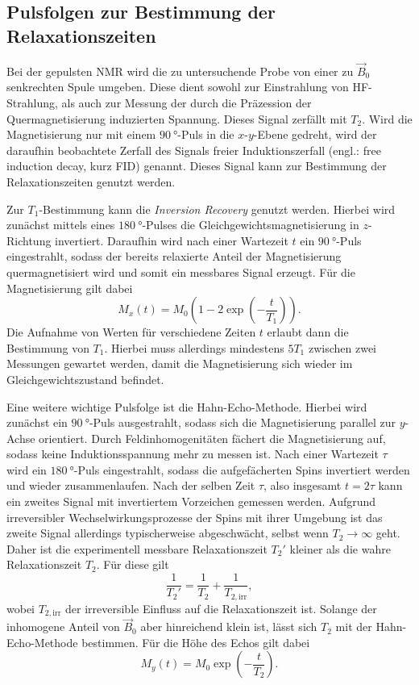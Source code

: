 \subsection{Pulsfolgen zur Bestimmung der Relaxationszeiten}
Bei der gepulsten NMR wird die zu untersuchende Probe von einer zu $\vec{B}_0$ senkrechten Spule umgeben. Diese dient sowohl zur Einstrahlung von HF-Strahlung, als auch zur Messung der durch die Präzession der Quermagnetisierung induzierten Spannung. Dieses Signal zerfällt mit $T_2$. Wird die Magnetisierung nur mit einem $\SI{90}{\degree}$-Puls in die $x$-$y$-Ebene gedreht, wird der daraufhin beobachtete Zerfall des Signals freier Induktionszerfall (engl.: free induction decay, kurz FID) genannt. Dieses Signal kann zur Bestimmung der Relaxationszeiten genutzt werden.

Zur $T_1$-Bestimmung kann die \textit{Inversion Recovery} genutzt werden. Hierbei wird zunächst mittels eines $\SI{180}{\degree}$-Pulses die Gleichgewichtsmagnetisierung in $z$-Richtung invertiert. Daraufhin wird nach einer Wartezeit $t$ ein $\SI{90}{\degree}$-Puls eingestrahlt, sodass der bereits relaxierte Anteil der Magnetisierung quermagnetisiert wird und somit ein messbares Signal erzeugt. Für die Magnetisierung gilt dabei
\begin{equation}
  M_x \left(t\right) = M_0 \left(1 - 2 \exp \left(-\frac{t}{T_1}\right)\right).
  \label{eq:T1}
\end{equation}
Die Aufnahme von Werten für verschiedene Zeiten $t$ erlaubt dann die Bestimmung von $T_1$. Hierbei muss allerdings mindestens $5T_1$ zwischen zwei Messungen gewartet werden, damit die Magnetisierung sich wieder im Gleichgewichtszustand befindet.

Eine weitere wichtige Pulsfolge ist die Hahn-Echo-Methode. Hierbei wird zunächst ein $\SI{90}{\degree}$-Puls ausgestrahlt, sodass sich die Magnetisierung parallel zur $y$-Achse orientiert. Durch Feldinhomogenitäten fächert die Magnetisierung auf, sodass keine Induktionsspannung mehr zu messen ist. Nach einer Wartezeit $\tau$ wird ein $\SI{180}{\degree}$-Puls eingestrahlt, sodass die aufgefächerten Spins invertiert werden und wieder zusammenlaufen. Nach der selben Zeit $\tau$, also insgesamt $t = 2\tau$ kann ein zweites Signal mit invertiertem Vorzeichen gemessen werden. Aufgrund irreversibler Wechselwirkungsprozesse der Spins mit ihrer Umgebung ist das zweite Signal allerdings typischerweise abgeschwächt, selbst wenn $T_2 \rightarrow \infty$ geht. Daher ist die experimentell messbare Relaxationszeit $T_2'$ kleiner als die wahre Relaxationszeit $T_2$. Für diese gilt
\begin{equation*}
  \frac{1}{T_2'} = \frac{1}{T_2} + \frac{1}{T_{2,\mathrm{irr}}},
\end{equation*}
wobei $T_{2,\mathrm{irr}}$ der irreversible Einfluss auf die Relaxationszeit ist. Solange der inhomogene Anteil von $\vec{B}_0$ aber hinreichend klein ist, lässt sich $T_2$ mit der Hahn-Echo-Methode bestimmen. Für die Höhe des Echos gilt dabei
\begin{equation}
  M_y \left(t\right) = M_0 \exp \left(-\frac{t}{T_2}\right).
  \label{eq:T2}
\end{equation}

